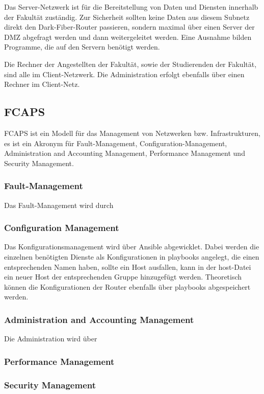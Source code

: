 \documentclass[a4paper]{article}
\begin{document}
Das Server-Netzwerk ist für die Bereitstellung von Daten und Diensten innerhalb der Fakultät zuständig. Zur Sicherheit sollten keine Daten aus diesem Subnetz direkt den Dark-Fiber-Router passieren, sondern maximal über einen Server der DMZ abgefragt werden und dann weitergeleitet werden. Eine Ausnahme bilden Programme, die auf den Servern benötigt werden.

Die Rechner der Angestellten der Fakultät, sowie der Studierenden der Fakultät, sind alle im Client-Netzwerk. Die Administration erfolgt ebenfalls über einen Rechner im Client-Netz.

\subsection{FCAPS}
FCAPS ist ein Modell für das Management von Netzwerken bzw. Infrastrukturen, es ist ein Akronym für Fault-Management, Configuration-Management, Administration and Accounting Management, Performance Management und Security Management.


\subsubsection{Fault-Management}
Das Fault-Management wird durch
\subsubsection{Configuration Management}
Das Konfigurationsmanagement wird über Ansible abgewicklet. Dabei werden die einzelnen benötigten Dienste als Konfigurationen in playbooks angelegt, die einen entsprechenden Namen haben, sollte ein Host ausfallen, kann in der host-Datei ein neuer Host der entsprechenden Gruppe hinzugefügt werden. Theoretisch können die Konfigurationen der Router ebenfalls über playbooks abgespeichert werden.
\subsubsection{Administration and Accounting Management}
Die Administration wird über 
\subsubsection{Performance Management}
\subsubsection{Security Management}
\end{document}
